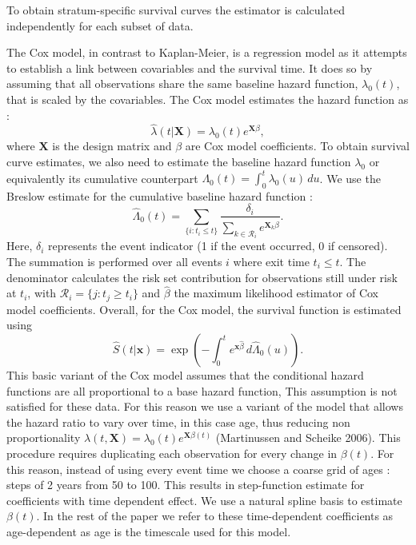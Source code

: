 \documentclass{article}
\begin{document}
To obtain stratum-specific survival curves the estimator is calculated
independently for each subset of data.

The Cox model, in contrast to Kaplan-Meier, is a regression model as it
attempts to establish a link between covariables and the survival time.
It does so by assuming that all observations share the same baseline
hazard function, \(\lambda_0(t)\), that is scaled by the covariables.
The Cox model estimates the hazard function as : \begin{equation}
\hat{\lambda}(t | \mathbf{X}) = \lambda_0(t) e^{\mathbf{X}\beta},
\end{equation} where \(\mathbf{X}\) is the design matrix and \(\beta\)
are Cox model coefficients. To obtain survival curve estimates, we also
need to estimate the baseline hazard function \(\lambda_0\) or
equivalently its cumulative counterpart
\(\Lambda_{0}(t) = \int_0^t \lambda_0(u)\,du\). We use the Breslow
estimate for the cumulative baseline hazard function : \begin{equation}
\hat{\Lambda}_{0}(t) = 
  \sum_{\{i : t_i \leq t\}}
      \frac{\delta_i}{
        \sum_{k \in \mathcal{R}_i} e^{\mathbf{X}_k\hat{\beta}}}.
\end{equation} Here, \(\delta_i\) represents the event indicator (1 if
the event occurred, 0 if censored). The summation is performed over all
events \(i\) where exit time \(t_i \leq t\). The denominator calculates
the risk set contribution for observations still under risk at \(t_i\),
with \(\mathcal{R}_i = \{j : t_j \geq t_i\}\) and \(\hat{\beta}\) the
maximum likelihood estimator of Cox model coefficients. Overall, for the
Cox model, the survival function is estimated using \begin{equation}
\hat{S}(t | \mathbf{x}) = \exp\left(-\int_0^t e^{\mathbf{x}\hat{\beta}} \, d\hat{\Lambda}_0(u)\right).
\end{equation} This basic variant of the Cox model assumes that the
conditional hazard functions are all proportional to a base hazard
function, This assumption is not satisfied for these data. For this
reason we use a variant of the model that allows the hazard ratio to
vary over time, in this case age, thus reducing non proportionality
\(\lambda(t, \mathbf{X}) = \lambda_{0}(t)e^{\mathbf{X}\beta(t)}\)
(Martinussen and Scheike 2006). This procedure requires duplicating each
observation for every change in \(\beta(t)\). For this reason, instead
of using every event time we choose a coarse grid of ages : steps of 2
years from 50 to 100. This results in step-function estimate for
coefficients with time dependent effect. We use a natural spline basis
to estimate \(\beta(t)\). In the rest of the paper we refer to these
time-dependent coefficients as age-dependent as age is the timescale
used for this model.
\end{document}
